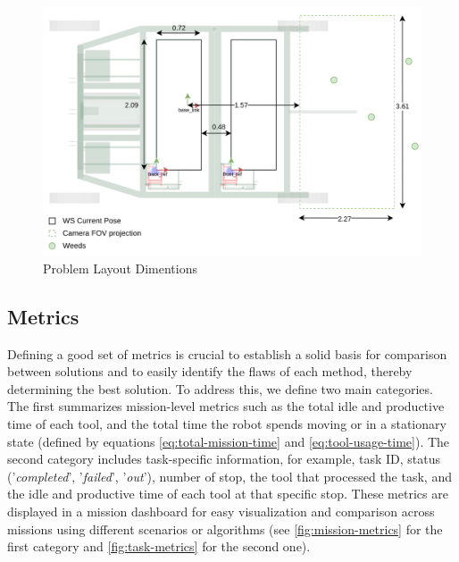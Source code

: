 \begin{figure}[bth]
    \centering
    \includegraphics[width=\linewidth]{gfx/ch02/problem_layout.png}
    \caption{Problem Layout Dimentions}
    \label{fig:problem-layout.png}
\end{figure}

\subsection{Metrics}
Defining a good set of metrics is crucial to establish a solid basis for comparison between solutions and to easily identify the flaws of each method, thereby determining the best solution. To address this, we define two main categories. The first summarizes mission-level metrics such as the total idle and productive time of each tool, and the total time the robot spends moving or in a stationary state (defined by equations \ref{eq:total-mission-time} and \ref{eq:tool-usage-time}). The second category includes task-specific information, for example, task ID, status ('\textit{completed}', '\textit{failed}', '\textit{out}'), number of stop, the tool that processed the task, and the idle and productive time of each tool at that specific stop. These metrics are displayed in a mission dashboard for easy visualization and comparison across missions using different scenarios or algorithms (see \autoref{fig:mission-metrics} for the first category and \ref{fig:task-metrics} for the second one).

